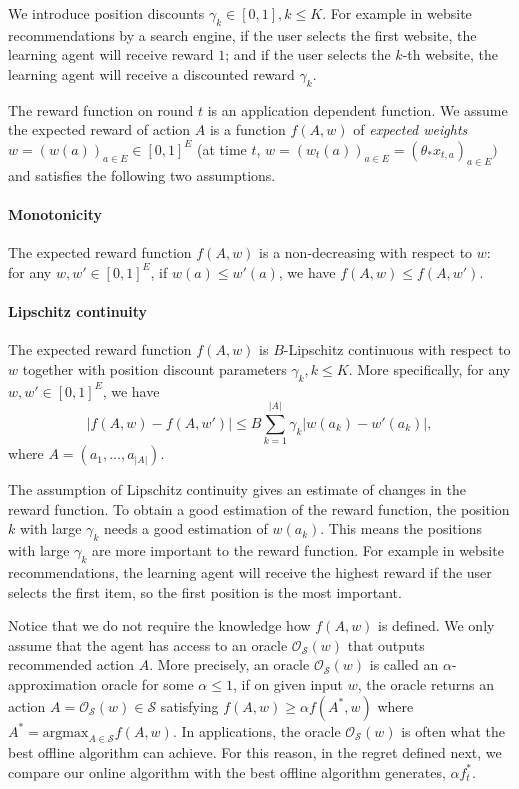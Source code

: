 \documentclass{article}
\newcommand{\cO}{\mathcal{O}}
\newcommand{\cS}{\mathcal{S}}
\newcommand{\argmax}{\mathrm{argmax}}
\begin{document}
We introduce position discounts $\gamma_k \in [0,1], k\leq K$. For example in website recommendations by a search engine, if the user selects the first website, the learning agent will receive reward $1$; and if the user selects the $k$-th website, the learning agent will receive a discounted reward $\gamma_k$.

The reward function on round $t$ is an application dependent function. We assume the expected reward of action $A$ is a function $f(A,w)$ of {\it expected weights} $w = (w(a))_{a \in E} \in [0,1]^{E}$ (at time $t$, $w = (w_t(a))_{a \in E} = (\theta_{\ast}x_{t,a})_{a \in E}) $ and satisfies the following two assumptions.

\paragraph{Monotonicity}
The expected reward function $f(A, w)$ is a non-decreasing with respect to $w$: for any $w,w'\in [0,1]^E$, if $w(a) \leq w'(a)$, we have $f(A, w) \leq f(A, w')$.

\paragraph{Lipschitz continuity}
The expected reward function $f(A, w)$ is $B$-Lipschitz continuous with respect to $w$ together with position discount parameters $\gamma_k, k\leq K$. More specifically, for any $w,w' \in [0,1]^E$, we have
$$
	|f(A, w) - f(A, w')| \leq B \sum_{k=1}^{|A|} \gamma_k |w(a_k) - w'(a_k)|,
$$
where $A = (a_1, \ldots, a_{|A|})$.

The assumption of Lipschitz continuity gives an estimate of changes in the reward function. To obtain a good estimation of the reward function, the position $k$ with large $\gamma_k$ needs a good estimation of $w(a_k)$. This means the positions with large $\gamma_k$ are more important to the reward function. For example in website recommendations, the learning agent will receive the highest reward if the user selects the first item, so the first position is the most important. 

Notice that we do not require the knowledge how $f(A, w)$ is defined. We only assume that the agent has access to an oracle $\cO_{\cS}(w)$ that outputs recommended action $A$. More precisely, an oracle $\cO_{\cS}(w)$ is called an $\alpha$-approximation oracle for some $\alpha \leq 1$, if on given input $w$, the oracle returns an action $A = \cO_{\cS}(w) \in \cS$ satisfying $f(A,w) \geq \alpha f(A^*,w)$ where $A^* = \argmax_{A\in\cS} f(A, w)$. In applications, the oracle $\cO_{\cS}(w)$ is often what the best offline algorithm can achieve. For this reason, in the regret defined next, we compare our online algorithm with the best offline algorithm generates, $\alpha f_t^{\ast}$.
\end{document}
